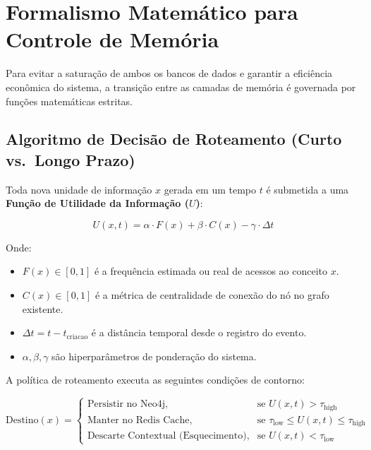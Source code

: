 \documentclass[11pt,a4paper]{article}
\begin{document}

\section{Formalismo Matemático para Controle de Memória}

Para evitar a saturação de ambos os bancos de dados e garantir a eficiência econômica do sistema,
a transição entre as camadas de memória é governada por funções matemáticas estritas.

\subsection{Algoritmo de Decisão de Roteamento (Curto vs.\ Longo Prazo)}

Toda nova unidade de informação $x$ gerada em um tempo $t$ é submetida a uma
\textbf{Função de Utilidade da Informação ($U$)}:

\begin{equation}
U(x, t) = \alpha \cdot F(x) + \beta \cdot C(x) - \gamma \cdot \Delta t
\end{equation}

Onde:
\begin{itemize}
    \item $F(x) \in [0, 1]$ é a frequência estimada ou real de acessos ao conceito $x$.
    \item $C(x) \in [0, 1]$ é a métrica de centralidade de conexão do nó no grafo existente.
    \item $\Delta t = t - t_{\text{criacao}}$ é a distância temporal desde o registro do evento.
    \item $\alpha, \beta, \gamma$ são hiperparâmetros de ponderação do sistema.
\end{itemize}

A política de roteamento executa as seguintes condições de contorno:

\begin{equation}
\text{Destino}(x) =
\begin{cases}
\text{Persistir no Neo4j},              & \text{se } U(x, t) > \tau_{\text{high}} \\
\text{Manter no Redis Cache},            & \text{se } \tau_{\text{low}} \le U(x, t) \le \tau_{\text{high}} \\
\text{Descarte Contextual (Esquecimento)}, & \text{se } U(x, t) < \tau_{\text{low}}
\end{cases}
\end{equation}
\end{document}
